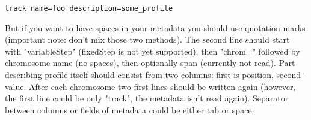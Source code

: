 \documentclass[a4paper,11pt,portrait]{article}
\begin{document}
\begin{verbatim} 
track name=foo description=some_profile
\end{verbatim}

But if you want to have spaces in your metadata
 you should use quotation marks
 (important note: don't mix those two methods).
 The second line should start with "variableStep"
 (fixedStep is not yet supported),
 then "chrom=" followed by chromosome name (no spaces),
 then optionally span (currently not read).
 Part describing profile itself should consist from two columns:
 first is position, second - value.
 After each chromosome two first lines should be written again
 (however, the first line could be only "track", the metadata isn't read again).
 Separator between columns or fields of metadata
 could be either tab or space.
\end{document}
